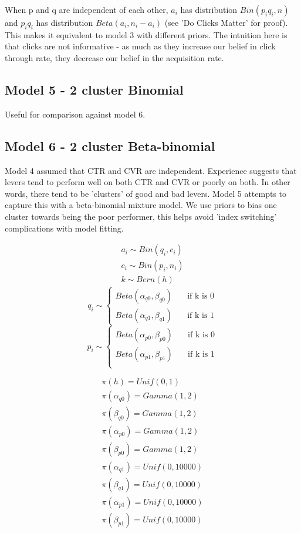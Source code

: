 \documentclass[11pt,a4,singlespacing,titlepagenumber=on]{scrreprt}
\numberwithin{equation}{chapter} %
\theoremstyle{remark}
\begin{document}
When p and q are independent of each other, $a_i$ has distribution $Bin(p_iq_i,n)$ and $p_iq_i$ has distribution $Beta(a_i,n_i - a_i)$ (see 'Do Clicks Matter' for proof). This makes it equivalent to model 3 with different priors. The intuition here is that clicks are not informative - as much as they increase our belief in click through rate, they decrease our belief in the acquisition rate.

\subsection{Model 5 - 2 cluster Binomial} 

Useful for comparison against model 6.

\subsection{Model 6 - 2 cluster Beta-binomial }

Model 4 assumed that CTR and CVR are independent. Experience suggests that levers tend to perform well on both CTR and CVR or poorly on both. In other words, there tend to be 'clusters' of good and bad levers. Model 5 attempts to capture this with a beta-binomial mixture model. We use priors to bias one cluster towards being the poor performer, this helps avoid 'index switching' complications with model fitting. 
 
 \begin{align}
	a_i \sim Bin(q_i,c_i) \\
	c_i \sim Bin(p_i,n_i) \\
	k \sim Bern(h) 
\end{align}
	\[ 
	q_i \sim 
  	\begin{cases}
		Beta(\alpha_{q0},\beta_{q0}) & \quad \text{if k is 0}\\
		Beta(\alpha_{q1},\beta_{q1}) & \quad \text{if k is 1}
	\end{cases}
	\]
	\[
	p_i \sim 
  	\begin{cases}
		Beta(\alpha_{p0},\beta_{p0}) & \quad \text{if k is 0}\\
		Beta(\alpha_{p1},\beta_{p1}) & \quad \text{if k is 1}\\
	\end{cases}
	\]

 \begin{align}
	\pi(h) = Unif(0,1) \\
	\pi(\alpha_{q0}) = Gamma(1,2) \\
	\pi(\beta_{q0}) = Gamma(1,2) \\
	\pi(\alpha_{p0}) = Gamma(1,2) \\
	\pi(\beta_{p0}) = Gamma(1,2) \\
	\pi(\alpha_{q1}) = Unif(0,10000) \\
	\pi(\beta_{q1}) = Unif(0,10000) \\
	\pi(\alpha_{p1}) = Unif(0,10000) \\
	\pi(\beta_{p1}) = Unif(0,10000)
\end{align}
\end{document}
